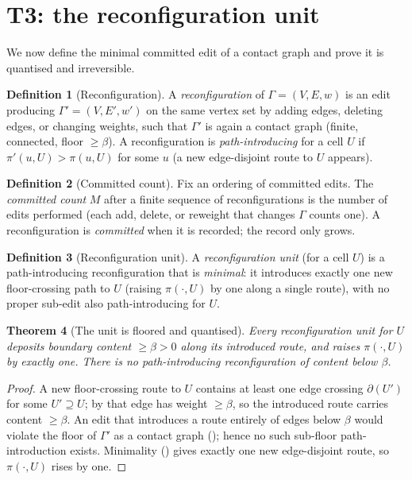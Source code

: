 \documentclass[11pt,a4paper]{article}
\theoremstyle{thmstyle}
\newtheorem{theorem}{Theorem}[section]
\theoremstyle{definition}
\newtheorem{definition}[theorem]{Definition}
\theoremstyle{remark}
\newcommand{\Gph}{\Gamma}
\newcommand{\V}{V}
\newcommand{\E}{E}
\newcommand{\wt}{w}
\newcommand{\floorc}{\beta}
\newcommand{\cut}{\partial}
\newcommand{\rec}{M}                %
\begin{document}
\section{T3: the reconfiguration unit}
\label{sec:unit}

We now define the minimal committed edit of a contact graph and prove it is
quantised and irreversible.

\begin{definition}[Reconfiguration]
\label{def:reconfig}
A \emph{reconfiguration} of $\Gph=(\V,\E,\wt)$ is an edit producing
$\Gph'=(\V,\E',\wt')$ on the same vertex set by adding edges, deleting edges,
or changing weights, such that $\Gph'$ is again a contact graph (finite,
connected, floor $\ge\floorc$). A reconfiguration is \emph{path-introducing}
for a cell $U$ if $\pi'(u,U)>\pi(u,U)$ for some $u$ (a new edge-disjoint
route to $U$ appears).
\end{definition}

\begin{definition}[Committed count]
\label{def:count}
Fix an ordering of committed edits. The \emph{committed count} $\rec$ after a
finite sequence of reconfigurations is the number of edits performed (each
add, delete, or reweight that changes $\Gph$ counts one). A
reconfiguration is \emph{committed} when it is recorded; the record only
grows.
\end{definition}

\begin{definition}[Reconfiguration unit]
\label{def:unit}
A \emph{reconfiguration unit} \textup{(}for a cell $U$\textup{)} is a
path-introducing reconfiguration that is \emph{minimal}: it introduces
exactly one new floor-crossing path to $U$ (raising $\pi(\cdot,U)$ by one
along a single route), with no proper sub-edit also path-introducing for $U$.
\end{definition}

\begin{theorem}[The unit is floored and quantised]
\label{thm:unit-floor}
Every reconfiguration unit for $U$ deposits boundary content $\ge\floorc>0$
along its introduced route, and raises $\pi(\cdot,U)$ by exactly one. There
is no path-introducing reconfiguration of content below $\floorc$.
\end{theorem}

\begin{proof}
A new floor-crossing route to $U$ contains at least one edge crossing
$\cut(U')$ for some $U'\supseteq U$; by  that edge has weight
$\ge\floorc$, so the introduced route carries content $\ge\floorc$. An edit
that introduces a route entirely of edges below $\floorc$ would violate the
floor of $\Gph'$ as a contact graph (); hence no such
sub-floor path-introduction exists. Minimality () gives
exactly one new edge-disjoint route, so $\pi(\cdot,U)$ rises by one.
\end{proof}
\end{document}
